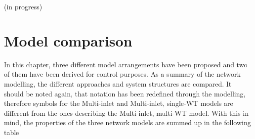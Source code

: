 (in progress)

\section{Model comparison}
\label{model_comparison}

In this chapter, three different model arrangements have been proposed and two of them have been derived for control purposes. As a summary of the network modelling, the different approaches and system structures are compared. It should be noted again, that notation has been redefined through the modelling, therefore symbols for the Multi-inlet and Multi-inlet, single-WT models are different from the ones describing the Multi-inlet, multi-WT model. With this in mind, the properties of the three network models are summed up in the following table

